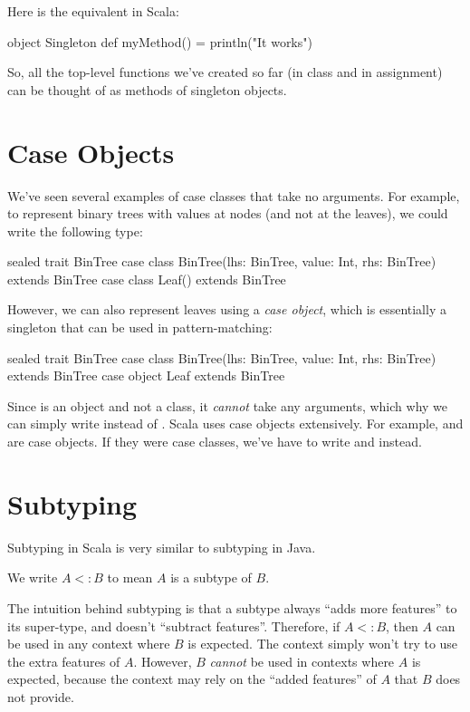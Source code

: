\documentclass[9pt]{extbook}
\begin{document}
Here is the equivalent in Scala:

\begin{scalacode}
object Singleton {
  def myMethod() = println("It works")
}
\end{scalacode}

So, all the top-level functions we've created so far (in class and in
assignment) can be thought of as methods of singleton objects.

\section{Case Objects}

We've seen several examples of case classes that take no arguments. For example,
to represent binary trees with values at nodes (and not at the leaves), we could
write the following type:
%
\begin{scalacode}
sealed trait BinTree
case class BinTree(lhs: BinTree, value: Int, rhs: BinTree) extends BinTree
case class Leaf() extends BinTree
\end{scalacode}

However, we can also represent leaves using a \emph{case object}, which is essentially
a singleton that can be used in pattern-matching:
%
\begin{scalacode}
sealed trait BinTree
case class BinTree(lhs: BinTree, value: Int, rhs: BinTree) extends BinTree
case object Leaf extends BinTree
\end{scalacode}

Since  is an object and not a class, it \emph{cannot}
take any arguments, which why we can simply write  instead
of . Scala uses case objects extensively. For example,
 and  are case objects. If they
were case classes, we've have to write  and
 instead.

\section{Subtyping}

Subtyping in Scala is very similar to subtyping in Java.

\begin{notation}
We write $A <: B$ to mean $A$ is a subtype of $B$.
\end{notation}

The intuition behind subtyping is that a subtype always ``adds more features''
to its super-type, and doesn't ``subtract features''. Therefore, if $A <: B$,
then $A$ can be used in any context where $B$ is expected. The context simply
won't try to use the extra features of $A$. However, $B$ \emph{cannot}
be used in contexts where $A$ is expected, because the context may rely on
the ``added features'' of $A$ that $B$ does not provide.
\end{document}
